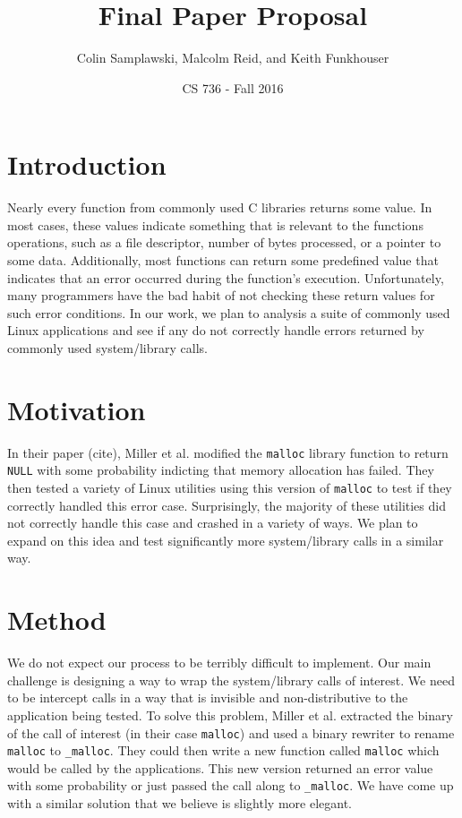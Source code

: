 \documentclass[10pt]{article}
\title{Final Paper Proposal}
\author{Colin Samplawski, Malcolm Reid, and Keith Funkhouser}
\date{CS 736 - Fall 2016}
\begin{document}
\maketitle
\setlength{\baselineskip}{18pt}
\section{Introduction}
Nearly every function from commonly used C libraries returns some value. In most cases, these values indicate something that is relevant to the  functions operations, such as a file descriptor, number of bytes processed, or a pointer to some data. Additionally, most functions can return some predefined value that indicates that an error occurred during the function's execution. Unfortunately, many programmers have the bad habit of not checking these return values for such error conditions. In our work, we plan to analysis a suite of commonly used Linux applications and see if any do not correctly handle errors returned by commonly used system/library calls.

\section{Motivation}
In their paper (cite), Miller et al. modified the \texttt{malloc} library function to return \texttt{NULL} with some probability indicting that memory allocation has failed. They then tested a variety of Linux utilities using this version of \texttt{malloc} to test if they correctly handled this error case. Surprisingly, the majority of these utilities did not correctly handle this case and crashed in a variety of ways. We plan to expand on this idea and test significantly more system/library calls in a similar way.

\section{Method}
We do not expect our process to be terribly difficult to implement. Our main challenge is designing a way to wrap the system/library calls of interest. We need to be intercept calls in a way that is invisible and non-distributive to the application being tested. To solve this problem, Miller et al. extracted the binary of the call of interest (in their case \texttt{malloc}) and used a binary rewriter to rename \texttt{malloc} to \texttt{\_malloc}. They could then write a new function called \texttt{malloc} which would be called by the applications. This new version returned an error value with some probability or just passed the call along to \texttt{\_malloc}. We have come up with a similar solution that we believe is slightly more elegant.
\end{document}
